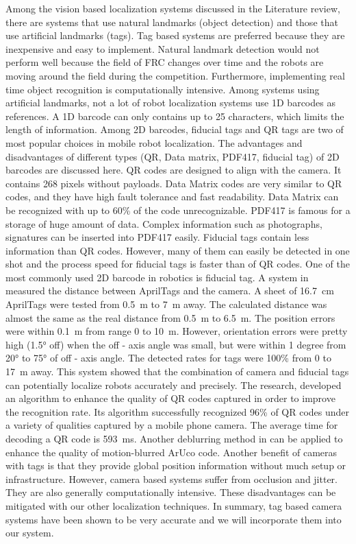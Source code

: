 \documentclass{article}
\begin{document}
  Among the vision based localization systems discussed in the Literature review, there are systems that use natural landmarks (object detection) and those that use artificial landmarks (tags). Tag based systems are preferred because they are inexpensive and easy to implement. Natural landmark detection would not perform well because the field of FRC changes over time and the robots are moving around the field during the competition. Furthermore, implementing real time object recognition is computationally intensive. Among systems using artificial landmarks, not a lot of robot localization systems use 1D barcodes as references. A 1D barcode can only contains up to 25 characters, which limits the length of information. Among 2D barcodes, fiducial tags and QR tags are two of most popular choices in mobile robot localization. The advantages and disadvantages of different types (QR, Data matrix, PDF417, fiducial tag) of 2D barcodes are discussed here. QR codes are designed to align with the camera. It contains 268 pixels without payloads. Data Matrix codes are very similar to QR codes, and they have high fault tolerance and fast readability. Data Matrix can be recognized with up to 60\% of the code unrecognizable. PDF417 is famous for a storage of huge amount of data. Complex information such as photographs, signatures can be inserted into PDF417 easily. Fiducial tags contain less information than QR codes. However, many of them can easily be detected in one shot and the process speed for fiducial tags is faster than of QR codes. One of the most commonly used 2D barcode in robotics is fiducial tag. A system in \cite{wang_apriltag_2016} measured the distance between AprilTags and the camera. A sheet of \SI{16.7}{\centi\meter} AprilTags were tested from \SI {0.5}{\meter} to \SI{7}{\meter} away. The calculated distance was almost the same as the real distance from \SI{0.5}{\meter} to \SI{6.5}{\meter}. The position errors were within \SI{0.1}{\meter} from range 0 to \SI{10}{\meter}. However, orientation errors were pretty high (\ang{1.5} off) when the off - axis angle was small, but were within 1 degree from \ang{20} to \ang{75} of off - axis angle. The detected rates for tags were 100\% from 0 to \SI{17}{\meter} away. This system showed that the combination of camera and fiducial tags can potentially localize robots accurately and precisely. The research, \cite{chen_two-stage_2013} developed an algorithm to enhance the quality of QR codes captured in order to improve the recognition rate. Its algorithm successfully recognized 96\% of QR codes under a variety of qualities captured by a mobile phone camera. The average time for decoding a QR code is \SI{593}{\milli\second}. Another deblurring method in \cite{xu_2d_2011} can be applied to enhance the quality of motion-blurred ArUco code.
  Another benefit of cameras with tags is that they provide global position information without much setup or infrastructure. However, camera based systems suffer from occlusion and jitter. They are also generally computationally intensive. These disadvantages can be mitigated with our other localization techniques. In summary, tag based camera systems have been shown to be very accurate and we will incorporate them into our system.
\end{document}
